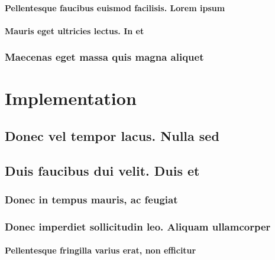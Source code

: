 \documentclass[bachelor, english, debug]{student}
\begin{document}
\lipsum[1-8]

\subsubsection{Pellentesque faucibus euismod facilisis. Lorem ipsum}

\lipsum[1-8]

\subsubsection{Mauris eget ultricies lectus. In et}

\lipsum[1-8]

\subsection{Maecenas eget massa quis magna aliquet}

\lipsum[1-8]





\chapter{Implementation}

\lipsum[1-8]

\section{Donec vel tempor lacus. Nulla sed}

\lipsum[1-8]

\section{Duis faucibus dui velit. Duis et}

\lipsum[1-8]

\subsection{Donec in tempus mauris, ac feugiat}

\lipsum[1-8]

\subsection{Donec imperdiet sollicitudin leo. Aliquam ullamcorper}

\lipsum[1-8]

\subsubsection{Pellentesque fringilla varius erat, non efficitur}
\end{document}
